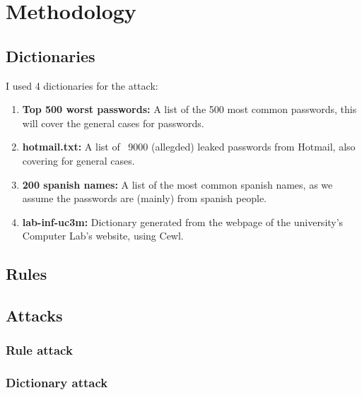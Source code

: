 \section{Methodology}

\subsection{Dictionaries}
I used 4 dictionaries for the attack:
\begin{enumerate}
    \item \textbf{Top 500 worst passwords:} A list of the 500 most common passwords, this will cover the general cases for passwords.
    \item \textbf{hotmail.txt:} A list of ~9000 (allegded) leaked passwords from Hotmail, also covering for general cases.
    \item \textbf{200 spanish names:} A list of the most common spanish names, as we assume the passwords are (mainly) from spanish people.
    \item \textbf{lab-inf-uc3m:} Dictionary generated from the webpage of the university's Computer Lab's website, using Cewl.
\end{enumerate}

\subsection{Rules}


\subsection{Attacks}

\subsubsection{Rule attack}

\subsubsection{Dictionary attack}
